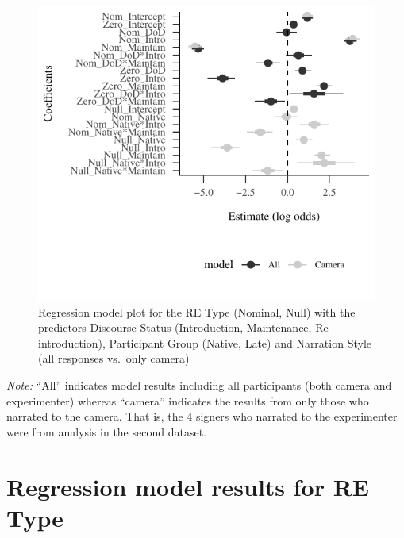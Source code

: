 \documentclass[review]{elsarticle} %
\begin{document}
\begin{figure}
\centering
\includegraphics{revised_manuscript_files/figure-latex/model-camera-1.pdf}
\caption{Regression model plot for the RE Type (Nominal, Null) with the
predictors Discourse Status (Introduction, Maintenance,
Re-introduction), Participant Group (Native, Late) and Narration Style
(all responses vs.~only camera)}
\end{figure}

\emph{Note:} ``All'' indicates model results including all participants
(both camera and experimenter) whereas ``camera'' indicates the results
from only those who narrated to the camera. That is, the 4 signers who
narrated to the experimenter were from analysis in the second dataset.

\clearpage

\hypertarget{regression-model-results-for-re-type}{%
\section{Regression model results for RE
Type}\label{regression-model-results-for-re-type}}

\label{section:modelResult}
\end{document}
